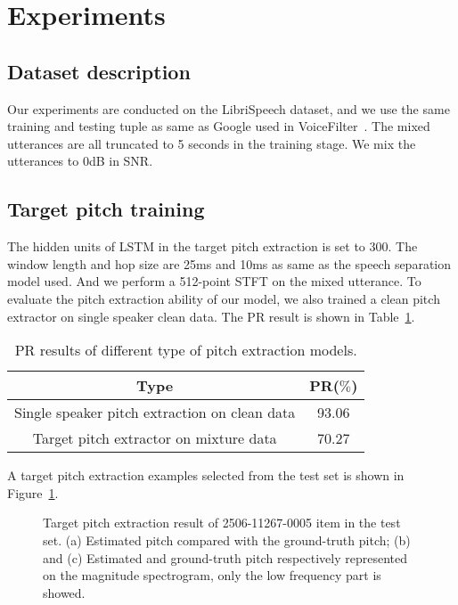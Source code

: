 

\section{Experiments}
\label{sec:exp_result}

\subsection{Dataset description}
\label{subsec:dataset}

Our experiments are conducted on the LibriSpeech dataset, and we use the same training and testing tuple as same as Google used in VoiceFilter~\cite{voicefilter}. The mixed utterances are all truncated to 5 seconds in the training stage. We mix the utterances to 0dB in SNR.

\subsection{Target pitch training}
\label{subsec:target_pitch_training}

The hidden units of LSTM in the target pitch extraction is set to 300. The window length and hop size are 25ms and 10ms as same as the speech separation model used. And we perform a 512-point STFT on the mixed utterance. To evaluate the pitch extraction ability of our model, we also trained a clean pitch extractor on single speaker clean data. The PR result is shown in Table~\ref{tab:pitch result}.

\begin{table}[htbp]
    \centering
    \begin{tabular}{c|c}
        \toprule
        Type                                          & PR($\%$) \\
        \midrule
        Single speaker pitch extraction on clean data & 93.06    \\
        \midrule
        Target pitch extractor on mixture data        & 70.27    \\
        \bottomrule
    \end{tabular}
    \caption{PR results of different type of pitch extraction models.}
    \label{tab:pitch result}
\end{table}

A target pitch extraction examples selected from the test set is shown in Figure~\ref{fig:pitch_1}.
\begin{figure}[t]

    \caption{Target pitch extraction result of 2506-11267-0005 item in the test set. (a) Estimated pitch compared with the ground-truth pitch; (b) and (c) Estimated and ground-truth pitch respectively represented on the magnitude spectrogram, only the low frequency part is showed. }
    \label{fig:pitch_1}
\end{figure}

